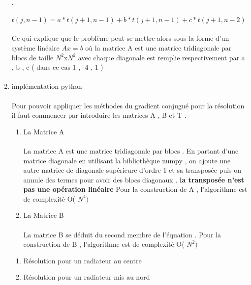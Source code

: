 \documentclass{article}
\begin{document}
\begin{enumerate}
    \paragraph{} 
    .
    \paragraph{}
   	
   $t(j,n-1) = a*t(j+1 , n-1) + b*t(j+1,n-1) + c*t(j+1,n-2)$ 
   
   \paragraph{} 
   Ce qui explique que le problème peut se mettre alors sous la forme d'un système linéaire $Ax=b$ où la matrice A est une matrice tridiagonale par blocs 
   de taille $N^2$x$N^2$ avec chaque diagonale est remplie respectivement par a , b , c ( dans ce cas 1 , -4 , 1 )  
   \paragraph{}
   \item{implémentation python} 
 	\paragraph{} 
 	Pour pouvoir appliquer les méthodes du gradient conjugué pour la résolution il faut commencer par introduire les matrices A , B et T . 
 	\begin{enumerate}
 		\item { La Matrice A } 
 		\paragraph{}
 		La matrice A est une matrice tridiagonale par blocs . En partant d'une matrice diagonale en utilisant la bibliothèque numpy , on ajoute une autre matrice de diagonale supérieure d'ordre 1 et sa transposée puis on annule des  termes pour avoir des blocs diagonaux .
 		\textbf{ la transposée n'est pas une opération linéaire } 
 		Pour la construction de A , l'algorithme est de complexité O( $N^4)$ 
 		\item{La Matrice B} 
 		\paragraph{}
 		La matrice B se déduit du second membre de l'équation . 
 		Pour la construction de B , l'algorithme est de complexité O( $N^2)$   
 	\end{enumerate}
   \begin{enumerate} 
   	\item { Résolution pour un radiateur au centre }  
   	\item{Résolution pour un radiateur mis au nord } 
   \end{enumerate}
   

\end{enumerate}
\end{document}
